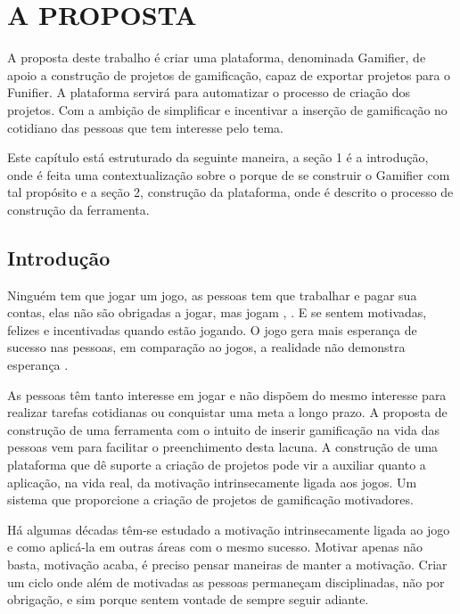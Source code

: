 
\chapter[A Proposta]{A PROPOSTA}

A proposta deste trabalho é criar uma plataforma, denominada Gamifier, de apoio a construção de projetos de gamificação, capaz de exportar projetos para o Funifier. A plataforma servirá para automatizar o processo de criação dos projetos. Com a ambição de simplificar e incentivar a inserção de gamificação no cotidiano das pessoas que tem interesse pelo tema.

 Este capítulo está estruturado da seguinte maneira, a seção 1 é a introdução, onde é feita uma contextualização sobre o porque de se construir o Gamifier com tal propósito e a seção 2, construção da plataforma, onde é descrito o processo de construção da ferramenta.           

\section{Introdução}

Ninguém tem que jogar um jogo, as pessoas tem que trabalhar e pagar sua contas, elas não são obrigadas a jogar, mas jogam \cite{chou2015actionable},  \cite{mcgonigal2011reality}. E se sentem motivadas, felizes e incentivadas quando estão jogando. O jogo gera mais esperança de sucesso nas pessoas, em comparação ao jogos, a realidade não demonstra esperança \cite{mcgonigal2011reality}.

As pessoas têm tanto interesse em jogar e não dispõem do mesmo interesse para realizar tarefas cotidianas ou conquistar uma meta a longo prazo. 
A proposta de construção de uma ferramenta com o intuito de inserir gamificação na vida das pessoas vem para facilitar o preenchimento desta lacuna. A construção de uma plataforma que dê suporte a criação de projetos pode vir a auxiliar quanto a aplicação, na vida real, da motivação intrinsecamente ligada aos jogos. Um sistema que proporcione a criação de projetos de gamificação motivadores.

Há algumas décadas têm-se estudado a motivação intrinsecamente ligada ao jogo e como aplicá-la em outras áreas com o mesmo sucesso. Motivar apenas não basta, motivação acaba, é preciso pensar maneiras de manter a motivação. Criar um ciclo onde além de motivadas as pessoas permaneçam disciplinadas, não por obrigação, e sim porque sentem vontade de sempre seguir adiante. 

